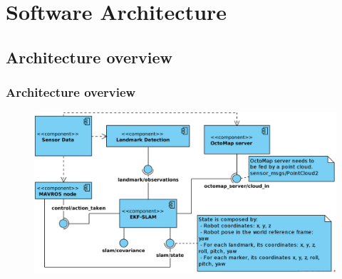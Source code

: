 \documentclass{beamer}
\DeclareMathOperator{\atantwo}{atan2}
\begin{document}

    \section{Software Architecture}
    \subsection{Architecture overview}
    \begin{frame}
        \justifying
        \frametitle{Architecture overview}

        \begin{figure}
            \centering
            \includegraphics[width=\textwidth]{components.png}
        \end{figure}


    \end{frame}
\end{document}
